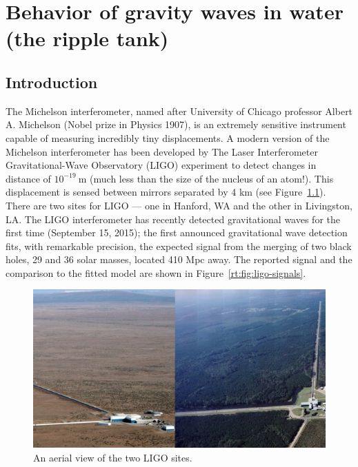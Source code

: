 \chapter{Behavior of gravity waves in water (the ripple tank)}

\section{Introduction}

The Michelson interferometer, named after University of Chicago professor Albert A. Michelson (Nobel prize in Physics 1907), is an extremely sensitive instrument capable of measuring incredibly tiny displacements.
A modern version of the Michelson interferometer has been developed by The Laser Interferometer Gravitational-Wave Observatory (LIGO) experiment to detect changes in distance of $10^{-19}\:$m (much less than the size of the nucleus of an atom!).
This displacement is sensed between mirrors separated by 4 km (see Figure~\ref{rt:fig:ligo-aerial}). There are two sites for LIGO --- one in Hanford, WA and the other in Livingston, LA.
The LIGO interferometer has recently detected gravitational waves for the first time (September 15, 2015); the first announced gravitational wave detection fits, with remarkable precision, the expected signal from the merging of two black holes, 29 and 36 solar masses, located 410 Mpc away.
The reported signal and the comparison to the fitted model are shown in Figure~\ref{rt:fig:ligo-signals}.

\begin{figure}
	\includegraphics[width=\textwidth]{ripple-tank/ligo-aerial.png}
	\caption{An aerial view of the two LIGO sites.}\label{rt:fig:ligo-aerial}
\end{figure}

